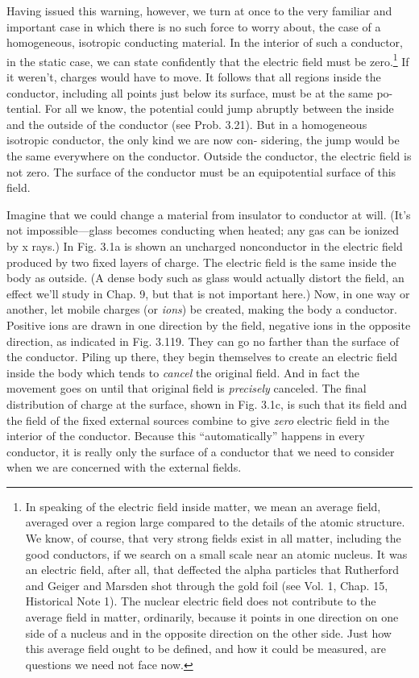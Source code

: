 Having issued this warning, however, we turn at once to the very
familiar and important case in which there is no such force to worry
about, the case of a homogeneous, isotropic conducting material.
In the interior of such a conductor, in the static case, we can state
confidently that the electric field must be zero.\footnote{In speaking of the electric field inside matter, we mean an average field, averaged
over a region large compared to the details of the atomic structure. We know, of course,
that very strong fields exist in all matter, including the good conductors, if we search
on a small scale near an atomic nucleus. It was an electric field, after all, that deffected
the alpha particles that Rutherford and Geiger and Marsden shot through the gold foil
(see Vol. 1, Chap. 15, Historical Note 1). The nuclear electric field does not contribute
to the average field in matter, ordinarily, because it points in one direction on one side
of a nucleus and in the opposite direction on the other side. Just how this average field
ought to be defined, and how it could be measured, are questions we need not face now.}
If it weren't, charges
would have to move. It follows that all regions inside the conductor,
including all points just below its surface, must be at the same po-
tential. For all we know, the potential could jump abruptly between
the inside and the outside of the conductor (see Prob. 3.21). But in
a homogeneous isotropic conductor, the only kind we are now con-
sidering, the jump would be the same everywhere on the conductor.
Outside the conductor, the electric field is not zero. The surface of
the conductor must be an equipotential surface of this field.

Imagine that we could change a material from insulator to conductor
at will. (It's not impossible---glass becomes conducting when
heated; any gas can be ionized by x rays.) In Fig. 3.1a is shown an
uncharged nonconductor in the electric field produced by two fixed
layers of charge. The electric field is the same inside the body as
outside. (A dense body such as glass would actually distort the field,
an effect we'll study in Chap. 9, but that is not important here.)
Now, in one way or another, let mobile charges (or \emph{ions}) be created,
making the body a conductor. Positive ions are drawn in one direction
by the field, negative ions in the opposite direction, as indicated
in Fig. 3.119. They can go no farther than the surface of the conductor.
Piling up there, they begin themselves to create an electric
field inside the body which tends to \emph{cancel} the original field. And
in fact the movement goes on until that original field is \emph{precisely} canceled.
The final distribution of charge at the surface, shown in
Fig. 3.1c, is such that its field and the field of the fixed external
sources combine to give \emph{zero} electric field in the interior of the 
conductor. Because this ``automatically'' happens in every conductor,
it is really only the surface of a conductor that we need to consider
when we are concerned with the external fields.

